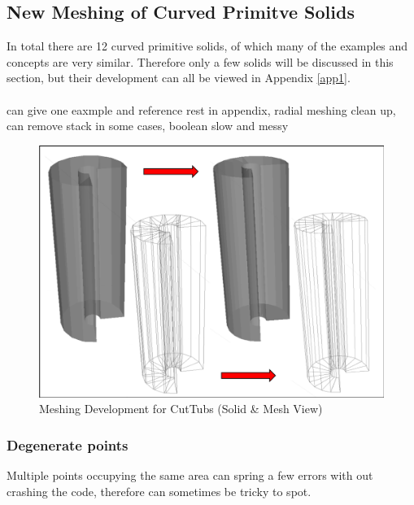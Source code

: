 \documentclass[12pt,a4paper]{article}
\begin{document}
\subsection{New Meshing of Curved Primitve Solids}
In total there are 12 curved primitive solids, of which many of the examples and concepts are very similar. Therefore only a few solids will be discussed in this section, but their development can all be viewed in Appendix \ref{app1}.
\\\\
can give one eaxmple and reference rest in appendix, radial meshing clean up, can remove stack in some cases, boolean slow and messy

\begin{figure}[h!]
\centering
\includegraphics[scale=0.5]{Images//Meshes//tubs.png}
\caption[width=\columnwidth]{Meshing Development for CutTubs (Solid \& Mesh View)}
\label{tubspic}
\end{figure}



\subsubsection{Degenerate points}
Multiple points occupying the same area can spring a few errors with out crashing the code, therefore can sometimes be tricky to spot. 
\end{document}
